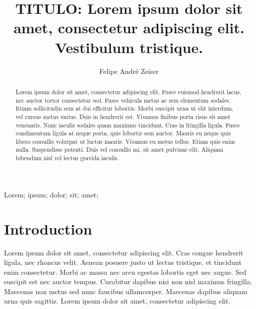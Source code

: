 \documentclass[preprint,12pt,authoryear]{elsarticle}
\begin{document}
\begin{frontmatter}



\title{TITULO: Lorem ipsum dolor sit amet, consectetur adipiscing elit. Vestibulum tristique.}

\author[1]{Felipe Andr\'e Zeiser}

\address[1]{Instituto Federal Sul-Rio-Grandense - Campus de Sapucaia do Sul}


\begin{abstract}
Lorem ipsum dolor sit amet, consectetur adipiscing elit. Fusce euismod hendrerit lacus, nec auctor tortor consectetur sed. Fusce vehicula metus ac sem elementum sodales. Etiam sollicitudin sem at dui efficitur lobortis. Morbi suscipit urna ut elit interdum, vel cursus metus varius. Duis in hendrerit est. Vivamus finibus porta risus sit amet venenatis. Nunc iaculis sodales quam maximus tincidunt. Cras in fringilla ligula. Fusce condimentum ligula at neque porta, quis lobortis sem auctor. Mauris eu neque quis libero convallis volutpat ut luctus mauris. Vivamus eu metus tellus. Etiam quis enim nulla. Suspendisse potenti. Duis vel convallis mi, sit amet pulvinar elit. Aliquam bibendum nisl vel lectus gravida iaculis.

\end{abstract}

\begin{keyword}
Lorem; ipsum; dolor; sit; amet;
\end{keyword}

\end{frontmatter}

\section{Introduction}

Lorem ipsum dolor sit amet, consectetur adipiscing elit. Cras congue hendrerit ligula, nec rhoncus velit. Aenean posuere justo ut lectus tristique, et tincidunt enim consectetur. Morbi ac massa nec arcu egestas lobortis eget nec augue. Sed suscipit est nec auctor tempus. Curabitur dapibus nisi non nisl maximus fringilla. Maecenas non metus sed nunc faucibus ullamcorper. Maecenas dapibus aliquam urna quis sagittis. Lorem ipsum dolor sit amet, consectetur adipiscing elit.
\end{document}
